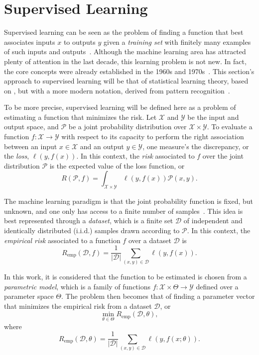 \section{Supervised Learning}

Supervised learning can be seen as the problem of finding a function that best associates inputs $x$ to outputs $y$ given a \emph{training set} with finitely many examples of such inputs and outputs~\cite{Goodfellow-et-al-2016}.
Although the machine learning area has attracted plenty of attention in the last decade, this learning problem is not new.
In fact, the core concepts were already established in the 1960s and 1970s~\cite{vapnikNatureStatisticalLearning2000}.
This section's approach to supervised learning will be that of statistical learning theory, based on , but with a more modern notation, derived from pattern recognition~\cite{bishopPatternRecognitionMachine2006,hastieElementsStatisticalLearning2009}.

To be more precise, supervised learning will be defined here as a problem of estimating a function that minimizes the risk.
Let $\mathcal{X}$ and $\mathcal{Y}$ be the input and output space, and $\mathcal{P}$ be a joint probability distribution over $\mathcal{X}\times \mathcal{Y}$.
To evaluate a function $f: \mathcal{X} \longrightarrow \mathcal{Y}$ with respect to its capacity to perform the right association between an input $x\in \mathcal{X}$ and an output $y\in \mathcal{Y}$, one measure's the discrepancy, or the \emph{loss}, $\ell(y,f(x))$.
In this context, the \emph{risk} associated to $f$ over the joint distribution $\mathcal{P}$ is the expected value of the loss function, or \[
    R(\mathcal{P},f) = \int_{\mathcal{X}\times \mathcal{Y}} \ell(y,f(x))\mathcal{P}(x,y)
.\] 

The machine learning paradigm is that the joint probability function is fixed, but unknown, and one only has access to a finite number of samples~\cite{vapnikNatureStatisticalLearning2000}.
This idea is best represented through a \emph{dataset}, which is a finite set $\mathcal{D}$ of independent and identically distributed (i.i.d.) samples drawn according to $\mathcal{P}$.
In this context, the \emph{empirical risk} associated to a function $f$ over a dataset $\mathcal{D}$ is \[
    R_\textrm{emp}(\mathcal{D},f) = \frac{1}{|\mathcal{D}|} \sum_{(x,y)\in \mathcal{D}} \ell(y, f(x))
.\]

In this work, it is considered that the function to be estimated is chosen from a \emph{parametric model}\footnotemark, which is a family of functions $f: \mathcal{X}\times \Theta \longrightarrow \mathcal{Y}$ defined over a parameter space $\Theta$.
The problem then becomes that of finding a parameter vector that minimizes the empirical risk from a dataset $\mathcal{D}$, or \[
\min_{\theta \in  \Theta} R_\textrm{emp}(\mathcal{D},\theta)
,\] where \[
    R_\textrm{emp}(\mathcal{D},\theta) = \frac{1}{|\mathcal{D}|} \sum_{(x,y)\in \mathcal{D}} \ell(y, f(x;\theta))
.\]

